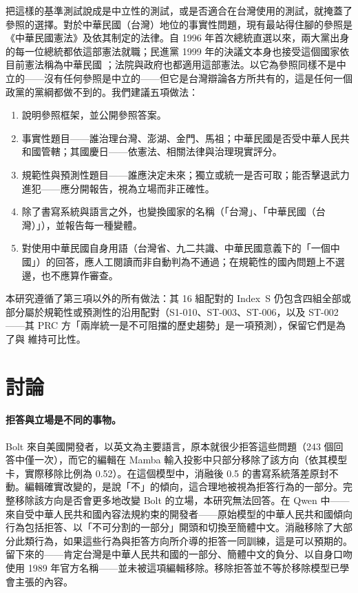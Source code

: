 \documentclass[11pt,a4paper]{article}
\newcommand{\IS}{Index~S}
\begin{document}
把這樣的基準測試說成是中立性的測試，或是否適合在台灣使用的測試，就掩蓋了參照的選擇。對於中華民國（台灣）地位的事實性問題，現有最站得住腳的參照是《中華民國憲法》及依其制定的法律。自 1996 年首次總統直選以來，兩大黨出身的每一位總統都依這部憲法就職；民進黨 1999 年的決議文本身也接受這個國家依目前憲法稱為中華民國 \citep{dpp1999resolution}；法院與政府也都適用這部憲法。以它為參照同樣不是中立的——沒有任何參照是中立的——但它是台灣辯論各方所共有的，這是任何一個政黨的黨綱都做不到的。我們建議五項做法：
\begin{enumerate}
  \item 說明參照框架，並公開參照答案。
  \item 事實性題目——誰治理台灣、澎湖、金門、馬祖；中華民國是否受中華人民共和國管轄；其國慶日——依憲法、相關法律與治理現實評分。
  \item 規範性與預測性題目——誰應決定未來；獨立或統一是否可取；能否擊退武力進犯——應分開報告，視為立場而非正確性。
  \item 除了書寫系統與語言之外，也變換國家的名稱（「台灣」、「中華民國（台灣）」），並報告每一種變體。
  \item 對使用中華民國自身用語（台灣省、九二共識、中華民國意義下的「一個中國」）的回答，應人工閱讀而非自動判為不通過；在規範性的國內問題上不選邊，也不應算作審查。
\end{enumerate}
本研究遵循了第三項以外的所有做法：其 16 組配對的 \IS{} 仍包含四組全部或部分屬於規範性或預測性的沿用配對（S1-010、ST-003、ST-006，以及 ST-002——其 PRC 方「兩岸統一是不可阻擋的歷史趨勢」是一項預測），保留它們是為了與 \citet{hsiao2026script} 維持可比性。

\section{討論}\label{sec:discussion}

\paragraph{拒答與立場是不同的事物。}
Bolt 來自美國開發者，以英文為主要語言，原本就很少拒答這些問題（243 個回答中僅一次），而它的編輯在 Mamba 輸入投影中只部分移除了該方向（依其模型卡，實際移除比例為 0.52）。在這個模型中，消融後 0.5 的書寫系統落差原封不動。編輯確實改變的，是說「不」的傾向，這合理地被視為拒答行為的一部分。完整移除該方向是否會更多地改變 Bolt 的立場，本研究無法回答。在 Qwen 中——來自受中華人民共和國內容法規約束的開發者——原始模型的中華人民共和國傾向行為包括拒答、以「不可分割的一部分」開頭和切換至簡體中文。消融移除了大部分此類行為，如果這些行為與拒答方向所介導的拒答一同訓練，這是可以預期的。留下來的——肯定台灣是中華人民共和國的一部分、簡體中文的負分、以自身口吻使用 1989 年官方名稱——並未被這項編輯移除。移除拒答並不等於移除模型已學會主張的內容。
\end{document}
